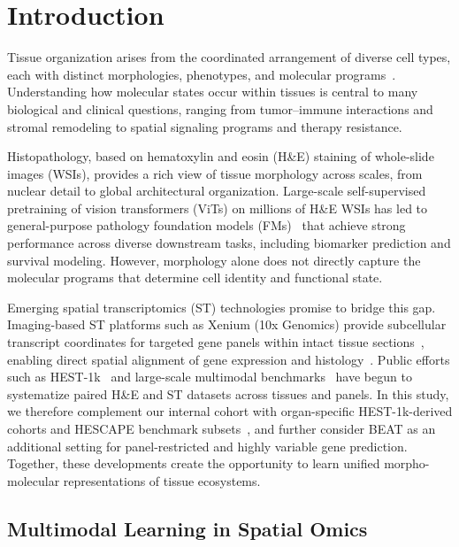 \section{Introduction}
\label{sec:introduction-1}

Tissue organization arises from the coordinated arrangement of diverse cell types, each with distinct morphologies, phenotypes, and molecular programs~\cite{kashyap_quantification_2022}. Understanding how molecular states occur within tissues is central to many biological and clinical questions, ranging from tumor–immune interactions and stromal remodeling to spatial signaling programs and therapy resistance. 

Histopathology, based on hematoxylin and eosin (H\&E) staining of whole-slide images (WSIs), provides a rich view of tissue morphology across scales, from nuclear detail to global architectural organization. Large-scale self-supervised pretraining of vision transformers (ViTs) on millions of H\&E WSIs has led to general-purpose pathology foundation models (FMs)~\cite{chen_generalpurposefoundationmodel_2024, vorontsov_foundationmodelclinicalgrade_2024} that achieve strong performance across diverse downstream tasks, including biomarker prediction and survival modeling. However, morphology alone does not directly capture the molecular programs that determine cell identity and functional state.

Emerging spatial transcriptomics (ST) technologies promise to bridge this gap. Imaging-based ST platforms such as Xenium (10x Genomics) provide subcellular transcript coordinates for targeted gene panels within intact tissue sections~\cite{bressan_dawnspatialomics_2023}, enabling direct spatial alignment of gene expression and histology~\cite{janesick_highresolutionmapping_2023}. Public efforts such as HEST-1k~\cite{jaume_hest1kdatasetspatial_2024} and large-scale multimodal benchmarks~\cite{gindra_largescalebenchmarkcrossmodal_2025} have begun to systematize paired H\&E and ST datasets across tissues and panels. In this study, we therefore complement our internal cohort with organ-specific HEST-1k-derived cohorts and HESCAPE benchmark subsets~\cite{jaume_hest1kdatasetspatial_2024,gindra_largescalebenchmarkcrossmodal_2025}, and further consider BEAT as an additional setting for panel-restricted and highly variable gene prediction. Together, these developments create the opportunity to learn unified morpho-molecular representations of tissue ecosystems.

\subsection*{Multimodal Learning in Spatial Omics}
\label{sec:multimodal-learning-in-spatial-omics}

